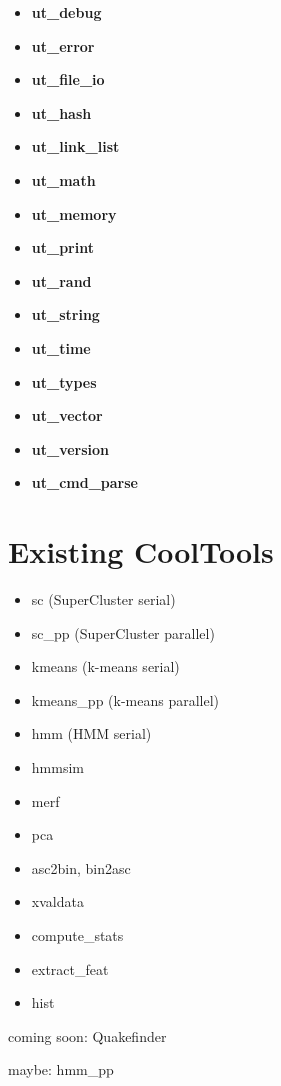 \begin{itemize}
\item {\bf ut\_debug}
\item {\bf ut\_error}
\item {\bf ut\_file\_io}
\item {\bf ut\_hash}
\item {\bf ut\_link\_list}
\item {\bf ut\_math}
\item {\bf ut\_memory}
\item {\bf ut\_print}
\item {\bf ut\_rand}
\item {\bf ut\_string}
\item {\bf ut\_time}
\item {\bf ut\_types}
\item {\bf ut\_vector}
\item {\bf ut\_version}
\item {\bf ut\_cmd\_parse}
\end{itemize}
	
\pagebreak
\section{Existing CoolTools}

\begin{itemize}
\item sc (SuperCluster serial)
\item sc\_pp (SuperCluster parallel)
\item kmeans (k-means serial)
\item kmeans\_pp (k-means parallel)
\item hmm (HMM serial)
\item hmmsim
\item merf
\item pca
\item asc2bin, bin2asc
\item xvaldata
\item compute\_stats
\item extract\_feat
\item hist
\end{itemize}

coming soon: Quakefinder

maybe: hmm\_pp



